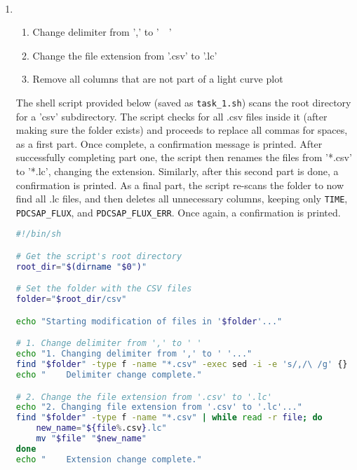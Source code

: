 \documentclass[a4paper,12pt]{article}
\title{\vspace{-25mm}{\normalsize\addfontfeatures{
  RawFeature={+cv08}}Semester I 2025}\\{
  \large\addfontfeatures{RawFeature={+cv08}}\medium{
  Astroinformatics I}}\\\LARGE\sbold{Graded Practice 2}}
\author{}
\date{\vspace{-22.5mm}}
\DeclareRobustCommand{\regular}{\fontseries{m}\selectfont}
\DeclareRobustCommand{\sbold}{\fontseries{sb}\selectfont}
\DeclareRobustCommand{\bold}{\fontseries{b}\selectfont}
\newcommand{\bcode}[1]{\texttt{\fontsize{11}{13}\selectfont\bold#1}}
\newenvironment{solution}{}{}
\begin{document}
\maketitle
\thispagestyle{fancy}
\sbold{\hspace{-6mm}José B. Batista M.\\}
\begin{enumerate}
  \item \sbold{Use the CSV files you generated from the FITS files in practice 1.
  Write shell scripts to modify them in the following way:}
  \begin{enumerate}[label=\alph*.]
    \item Change delimiter from ',' to '\ \ '
    \item Change the file extension from '.csv' to '.lc'
    \item Remove all columns that are not part of a light curve plot
  \end{enumerate}
  \begin{solution}
    \regular The shell script provided below (saved as \bcode{task\_1.sh}) scans
    the root directory for a 'csv' subdirectory. The script checks for all .csv
    files inside it (after making sure the folder exists) and proceeds to replace
    all commas for spaces, as a first part. Once complete, a confirmation message
    is printed. After successfully completing part one, the script then renames
    the files from '*.csv' to '*.lc', changing the extension. Similarly, after
    this second part is done, a confirmation is printed. As a final part, the
    script re-scans the folder to now find all .lc files, and then deletes all
    unnecessary columns, keeping only \bcode{TIME}, \bcode{PDCSAP\_FLUX}, and
    \bcode{PDCSAP\_FLUX\_ERR}. Once again, a confirmation is printed.\\
    \begin{lstlisting}[language=bash]
#!/bin/sh

# Get the script's root directory
root_dir="$(dirname "$0")"

# Set the folder with the CSV files
folder="$root_dir/csv"

echo "Starting modification of files in '$folder'..."

# 1. Change delimiter from ',' to ' '
echo "1. Changing delimiter from ',' to ' '..."
find "$folder" -type f -name "*.csv" -exec sed -i -e 's/,/\ /g' {} \;
echo "    Delimiter change complete."

# 2. Change the file extension from '.csv' to '.lc'
echo "2. Changing file extension from '.csv' to '.lc'..."
find "$folder" -type f -name "*.csv" | while read -r file; do
    new_name="${file%.csv}.lc"
    mv "$file" "$new_name"
done
echo "    Extension change complete."


\end{lstlisting}
\end{solution}
\end{enumerate}
\end{document}
